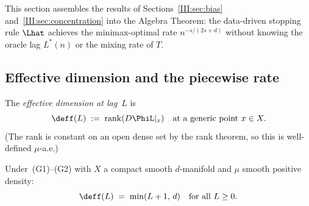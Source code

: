 This section assembles the results of Sections~\ref{III:sec:bias}
and~\ref{III:sec:concentration} into the Algebra Theorem: the data-driven stopping
rule $\Lhat$ achieves the minimax-optimal rate $n^{-s/(2s+d)}$ without knowing
the oracle lag $L^*(n)$ or the mixing rate of $T$.

\subsection{Effective dimension and the piecewise rate}

\begin{definition}
\label{III:def:deff}
The \emph{effective dimension at lag~$L$} is
\[
  \deff(L) \;:=\; \operatorname{rank}(D\PhiL|_x)
  \quad\text{at a generic point } x \in X.
\]
(The rank is constant on an open dense set by the rank theorem, so this is
well-defined $\mu$-a.e.)
\end{definition}

\begin{lemma}
\label{III:lem:dimeff}
Under~(G1)--(G2) with $X$ a compact smooth $d$-manifold and $\mu$ smooth
positive density:
\[
  \deff(L) \;=\; \min(L+1,\, d) \quad \text{for all } L \geq 0.
\]
\end{lemma}

